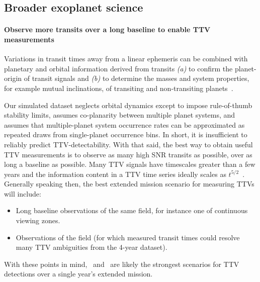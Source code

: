 \subsection{Broader exoplanet science}
\label{sec:broader_exoplanet_science}

\paragraph{Observe more transits over a long baseline to enable TTV measurements}
Variations in transit times away from a linear ephemeris can be combined with planetary and orbital information derived from transits \textit{(a)} to confirm the planet-origin of transit signals and \textit{(b)} to determine the masses and system properties, for example mutual inclinations, of transiting and non-transiting planets~\citep{agol_detecting_2005}.

Our simulated dataset neglects orbital dynamics except to impose rule-of-thumb stability limits, assumes co-planarity between multiple planet systems, and assumes that multiple-planet system occurrence rates can be approximated as repeated draws from single-planet occurrence bins.
In short, it is insufficient to reliably predict TTV-detectability.
With that said, the best way to obtain useful TTV measurements is to observe as many high SNR transits as possible, over as long a baseline as possible.
Many TTV signals have timescales greater than a few years
and the information content in a TTV time series ideally scales as $t^{5/2}$~\citep{fabrycky_whitepaper_2013}.
Generally speaking then, the best extended mission scenario for measuring TTVs will include:
\begin{itemize}
	\item Long baseline observations of the same field, for instance one of \tesss continuous viewing zones.
	\item Observations of the \kepler field (for which measured transit times could resolve many TTV ambiguities from the 4-year dataset).
\end{itemize}
With these points in mind, \nhemi\ and \npole\ are likely the strongest scenarios for TTV detections over a single year's extended mission.

\begin{comment}
\textbf{Focus on compact multiple-planet systems}
\citet{muirhead_kepler-445_2015} estimate that $21^{+7}_{-5}\%$ of mid-M dwarfs host multiple planets with periods of less than 10 days.
\end{comment}



